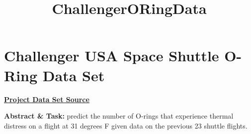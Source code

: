 \documentclass[11pt]{article}
\title{ChallengerORingData}
\begin{document}
    
    
    \maketitle
    
    

    
    \hypertarget{challenger-usa-space-shuttle-o-ring-data-set}{%
\section{Challenger USA Space Shuttle O-Ring Data
Set}\label{challenger-usa-space-shuttle-o-ring-data-set}}

\textbf{\href{https://archive.ics.uci.edu/ml/datasets/Challenger+USA+Space+Shuttle+O-Ring}{Project
Data Set Source}}

\textbf{Abstract \& Task:} predict the number of O-rings that experience
thermal distress on a flight at 31 degrees F given data on the previous
23 shuttle flights.
\end{document}
